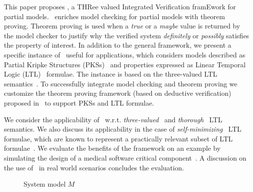 This paper proposes \NAME , a THRee valued Integrated Verification framEwork for partial models.
\NAME\ enriches model checking for partial models with theorem proving.
Theorem proving is used when a \emph{true} or a \emph{maybe} value is returned by the model checker to justify why the verified system \emph{definitely}  or \emph{possibly} satisfies the property of interest.
In addition to the general framework, we present  a specific instance of \NAME\ useful for applications, which considers models described as Partial Kripke Structures (PKSs)~\cite{bruns1999model} and properties expressed as Linear Temporal Logic (LTL)~\cite{pnueli1977temporal} formulae.
The instance is based on the three-valued LTL semantics~\cite{bruns1999model}.
To successfully integrate model checking and theorem proving we customize the theorem proving framework (based on deductive verification) proposed in~\cite{peled2001model} to support PKSs and LTL formulae.

We consider the applicability of \NAME\  w.r.t.  \emph{three-valued}~\cite{bruns1999model} and  \emph{thorough}~\cite{bruns2000model} LTL semantics. 
We also discuss its applicability in the case of \emph{self-minimizing}~\cite{godefroid2005MCvsGMC} LTL formulae, which are known to represent a practically relevant subset of LTL formulae~\cite{antonik2006efficient}. 
We evaluate the benefits of the framework on an example by simulating  the design of a medical software critical component~\cite{arcaini2015formal}.
A discussion on the use of \NAME\ in real world scenarios concludes the evaluation.




\begin{figure}[t]
 \centering

\caption{System model $M$}
\label{fig:modelmot}
\end{figure}


